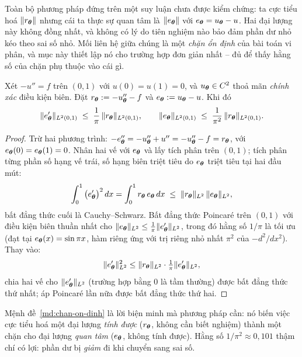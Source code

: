 Toàn bộ phương pháp đứng trên một suy luận chưa được kiểm chứng: ta cực tiểu hoá
$\lVert r_{\bm{\theta}}\rVert$ nhưng cái ta thực sự quan tâm là $\lVert e_{\bm{\theta}}\rVert$ với
$e_{\bm{\theta}} = u_{\bm{\theta}} - u$. Hai đại lượng này không đồng nhất, và không có
lý do tiên nghiệm nào bảo đảm phần dư nhỏ kéo theo sai số nhỏ. Mối liên hệ giữa
chúng là một \emph{chặn ổn định} của bài toán vi phân, và mục này thiết lập nó
cho trường hợp đơn giản nhất -- đủ để thấy hằng số của chặn phụ thuộc vào cái gì.
 
\begin{menhde}
\label{md:chan-on-dinh}
Xét $-u'' = f$ trên $(0,1)$ với $u(0) = u(1) = 0$, và $u_{\bm{\theta}} \in C^2$ thoả
mãn \emph{chính xác} điều kiện biên. Đặt $r_{\bm{\theta}} := -u_{\bm{\theta}}'' - f$ và
$e_{\bm{\theta}} := u_{\bm{\theta}} - u$. Khi đó
\begin{equation}
\lVert e_{\bm{\theta}}'\rVert_{L^2(0,1)} \;\le\; \frac{1}{\pi}\,
  \lVert r_{\bm{\theta}}\rVert_{L^2(0,1)},
\qquad
\lVert e_{\bm{\theta}}\rVert_{L^2(0,1)} \;\le\; \frac{1}{\pi^{2}}\,
  \lVert r_{\bm{\theta}}\rVert_{L^2(0,1)} .
\label{eq:chan-poisson}
\end{equation}
\end{menhde}
 
\begin{proof}
Trừ hai phương trình: $-e_{\bm{\theta}}'' = -u_{\bm{\theta}}'' + u'' = -u_{\bm{\theta}}'' - f
= r_{\bm{\theta}}$, với $e_{\bm{\theta}}(0) = e_{\bm{\theta}}(1) = 0$. Nhân hai vế với
$e_{\bm{\theta}}$ và lấy tích phân trên $(0,1)$; tích phân từng phần số hạng vế trái,
số hạng biên triệt tiêu do $e_{\bm{\theta}}$ triệt tiêu tại hai đầu mút:
\[
\int_0^1 \big(e_{\bm{\theta}}'\big)^2\,dx
 = \int_0^1 r_{\bm{\theta}}\, e_{\bm{\theta}}\,dx
 \;\le\; \lVert r_{\bm{\theta}}\rVert_{L^2}\,\lVert e_{\bm{\theta}}\rVert_{L^2},
\]
bất đẳng thức cuối là Cauchy--Schwarz. Bất đẳng thức Poincaré trên $(0,1)$ với
điều kiện biên thuần nhất cho $\lVert e_{\bm{\theta}}\rVert_{L^2} \le
\tfrac{1}{\pi}\lVert e_{\bm{\theta}}'\rVert_{L^2}$, trong đó hằng số $1/\pi$ là tối ưu (đạt
tại $e_{\bm{\theta}}(x) = \sin\pi x$, hàm riêng ứng với trị riêng nhỏ nhất $\pi^2$
của $-d^2/dx^2$). Thay vào:
\[
\lVert e_{\bm{\theta}}'\rVert^2_{L^2}
 \le \lVert r_{\bm{\theta}}\rVert_{L^2}\cdot\tfrac{1}{\pi}\lVert e_{\bm{\theta}}'\rVert_{L^2},
\]
chia hai vế cho $\lVert e_{\bm{\theta}}'\rVert_{L^2}$ (trường hợp bằng $0$ là tầm thường)
được bất đẳng thức thứ nhất; áp Poincaré lần nữa được bất đẳng thức thứ hai.
\end{proof}
 
Mệnh đề~\ref{md:chan-on-dinh} là lời biện minh mà phương pháp cần: nó biến việc
cực tiểu hoá một đại lượng \emph{tính được} ($r_{\bm{\theta}}$, không cần biết
nghiệm) thành một chặn cho đại lượng \emph{quan tâm} ($e_{\bm{\theta}}$, không tính
được). Hằng số $1/\pi^2 \approx 0{,}101$ thậm chí có lợi: phần dư bị \emph{giảm}
đi khi chuyển sang sai số.
 
